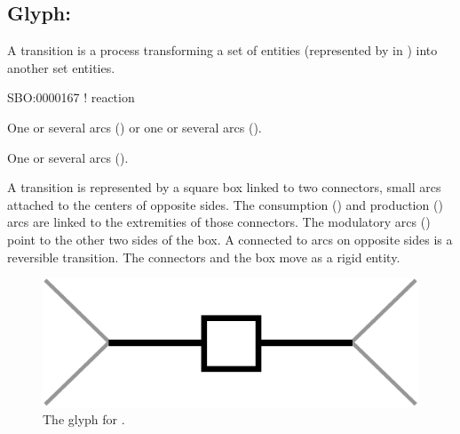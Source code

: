 
\color{red}
\subsection{Glyph: }
\label{sec:transition}

A transition is a process transforming a set of entities (represented by  in \SBGNPDLone) into another set entities.

\begin{glyphDescription}

\glyphSboTerm SBO:0000167 ! reaction

\glyphOrigin One or several  arcs () or one or several  arcs ().

\glyphTarget One or several  arcs ().

\glyphNode A transition is represented by a square box linked to two connectors, small arcs attached to the centers of opposite sides. The consumption () and production () arcs are linked to the extremities of those connectors. The modulatory arcs () point to the other two sides of the box. A  connected to  arcs on opposite sides is a reversible transition. The connectors and the box move as a rigid entity.

\end{glyphDescription}

\begin{figure}[H]
  \centering
  \includegraphics[scale = 0.4]{images/transition}
  \caption{The \ER glyph for .}
  \label{fig:transition}
\end{figure}

